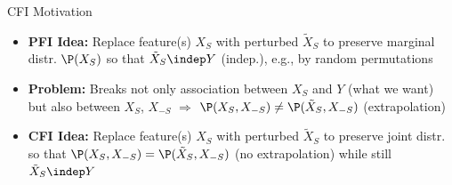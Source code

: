 \documentclass[10pt,compress,t,notes=noshow, xcolor=table]{beamer}
\begin{document}
\begin{framev}[align=top]{CFI Motivation}
\begin{itemize}[<+->]
\item \textbf{PFI Idea:} Replace feature(s) $X_S$ with perturbed $\tilde X_S$ to preserve marginal distr. $\P(X_S)$ so that $\tilde X_S \indep Y$ (indep.), e.g., by random permutations
\item \textbf{Problem:} Breaks not only association between $X_S$ and $Y$ (what we want) but also between $X_S$, $X_{-S}$ $\Rightarrow$ $\P(X_S, X_{-S}) \neq \P(\tilde X_S, X_{-S})$ (extrapolation)
\item \textbf{CFI Idea:} Replace feature(s) $X_S$ with perturbed $\tilde X_S$ to preserve joint distr. so that $\P(X_S, X_{-S}) = \P(\tilde X_S, X_{-S})$ (no extrapolation) while still $\tilde X_S \indep Y$
\end{itemize}
\spacer[0.25]
\end{framev}
\end{document}
